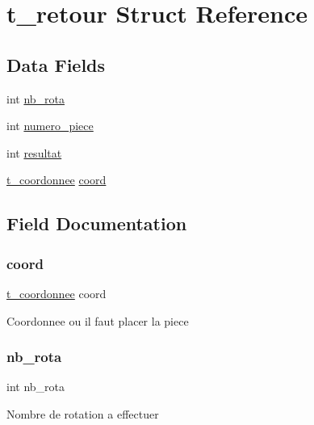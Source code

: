 \hypertarget{structt__retour}{}\section{t\+\_\+retour Struct Reference}
\label{structt__retour}
\subsection*{Data Fields}
\begin{DoxyCompactItemize}
\item 
int \mbox{\hyperlink{structt__retour_a6623c6e672e749d7cfdf08830bbc5a13}{nb\+\_\+rota}}
\item 
int \mbox{\hyperlink{structt__retour_a48696256120eb2569549fbf206502ce1}{numero\+\_\+piece}}
\item 
int \mbox{\hyperlink{structt__retour_a8afc85cb27005e2bd7dfc73222b85a46}{resultat}}
\item 
\mbox{\hyperlink{structt__coordonnee}{t\+\_\+coordonnee}} \mbox{\hyperlink{structt__retour_a41604ec3aac6c0abd76056239bf73f28}{coord}}
\end{DoxyCompactItemize}


\subsection{Field Documentation}
\mbox{\label{structt__retour_a41604ec3aac6c0abd76056239bf73f28}} 
\subsubsection{\texorpdfstring{coord}{coord}}
{\footnotesize\ttfamily \mbox{\hyperlink{structt__coordonnee}{t\+\_\+coordonnee}} coord}

Coordonnee ou il faut placer la piece \mbox{\label{structt__retour_a6623c6e672e749d7cfdf08830bbc5a13}} 
\subsubsection{\texorpdfstring{nb\+\_\+rota}{nb\_rota}}
{\footnotesize\ttfamily int nb\+\_\+rota}

Nombre de rotation a effectuer \mbox{\label{structt__retour_a48696256120eb2569549fbf206502ce1}} 
